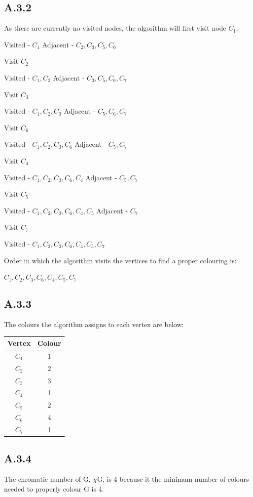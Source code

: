\documentclass{article}
\begin{document}
\subsection*{A.3.2}
As there are currently no visited nodes, the algorithm will first visit node $C_1$.
\begin{center}
Visited - $C_1$
\newline
Adjacent - $C_2,C_3,C_5,C_6$
\newline
\end{center}
Visit $C_2$
\begin{center}
Visited - $C_1,C_2$
\newline
Adjacent - $C_3,C_5,C_6,C_7$
\newline
\end{center}
Visit $C_3$
\begin{center}
Visited - $C_1,C_2,C_3$
\newline
Adjacent - $C_5,C_6,C_7$
\newline
\end{center}
Visit $C_6$
\begin{center}
Visited - $C_1,C_2,C_3,C_6$
\newline
Adjacent - $C_5,C_7$
\end{center}
Visit $C_4$
\begin{center}
Visited - $C_1,C_2,C_3,C_6,C_4$
\newline
Adjacent - $C_5,C_7$
\end{center}
Visit $C_5$
\begin{center}
Visited - $C_1,C_2,C_3,C_6,C_4,C_5$
\newline
Adjacent - $C_7$
\newline
\end{center}
Visit $C_7$
\begin{center}
Visited - $C_1,C_2,C_3,C_6,C_4,C_5,C_7$
\newline
\end{center}
Order in which the algorithm visits the vertices to find a proper colouring is:
\newline
\begin{center}
$C_1,C_2,C_3,C_6,C_4,C_5,C_7$
\end{center}
\subsection*{A.3.3}
The colours the algorithm assigns to each vertex are below:
\begin{center}
\begin{tabular}{ |c|c| }
\hline
Vertex & Colour \\
\hline
$C_1$  & 1      \\
$C_2$  & 2      \\
$C_3$  & 3      \\
$C_4$  & 1      \\
$C_5$  & 2      \\
$C_6$  & 4      \\
$C_7$  & 1       \\
\hline
\end{tabular}
\end{center}
\subsection*{A.3.4}
The chromatic number of G, $\chi$G, is 4 because it the minimum number of colours needed to properly colour G is 4.
\end{document}
